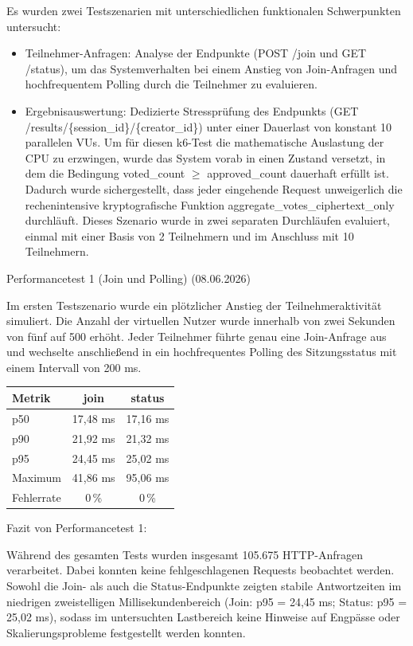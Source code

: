 Es wurden zwei Testszenarien mit unterschiedlichen funktionalen Schwerpunkten untersucht:

\begin{itemize}
    \item Teilnehmer-Anfragen: Analyse der Endpunkte (POST /join und GET /status), um das Systemverhalten bei einem Anstieg von Join-Anfragen und hochfrequentem Polling durch die Teilnehmer zu evaluieren.
    \item Ergebnisauswertung: Dedizierte Stressprüfung des Endpunkts (GET /results/\{session\_id\}/\{creator\_id\}) unter einer Dauerlast von konstant 10 parallelen VUs. Um für diesen k6-Test die mathematische Auslastung der CPU zu erzwingen, wurde das System vorab in einen Zustand versetzt, in dem die Bedingung voted\_count $\geq$ approved\_count dauerhaft erfüllt ist. Dadurch wurde sichergestellt, dass jeder eingehende Request unweigerlich die rechenintensive kryptografische Funktion aggregate\_votes\_ciphertext\_only durchläuft. Dieses Szenario wurde in zwei separaten Durchläufen evaluiert, einmal mit einer Basis von 2 Teilnehmern und im Anschluss mit 10 Teilnehmern.
\end{itemize}

Performancetest 1 (Join und Polling) (08.06.2026)

Im ersten Testszenario wurde ein plötzlicher Anstieg der Teilnehmeraktivität simuliert. Die Anzahl der virtuellen Nutzer wurde innerhalb von zwei Sekunden von fünf auf 500 erhöht. Jeder Teilnehmer führte genau eine Join-Anfrage aus und wechselte anschließend in ein hochfrequentes Polling des Sitzungsstatus mit einem Intervall von 200 ms.

\begin{table}[h]
\centering
\begin{tabular}{|l|c|c|}
\hline
\textbf{Metrik} & \textbf{join} & \textbf{status} \\
\hline
p50 & 17,48 ms & 17,16 ms \\
\hline
p90 & 21,92 ms & 21,32 ms \\
\hline
p95 & 24,45 ms & 25,02 ms \\
\hline
Maximum & 41,86 ms & 95,06 ms \\
\hline
Fehlerrate & 0\,\% & 0\,\% \\
\hline
\end{tabular}
\end{table}

Fazit von Performancetest 1:

Während des gesamten Tests wurden insgesamt 105.675 HTTP-Anfragen verarbeitet. Dabei konnten keine fehlgeschlagenen Requests beobachtet werden. Sowohl die Join- als auch die Status-Endpunkte zeigten stabile Antwortzeiten im niedrigen zweistelligen Millisekundenbereich (Join: p95 = 24,45 ms; Status: p95 = 25,02 ms), sodass im untersuchten Lastbereich keine Hinweise auf Engpässe oder Skalierungsprobleme festgestellt werden konnten.

